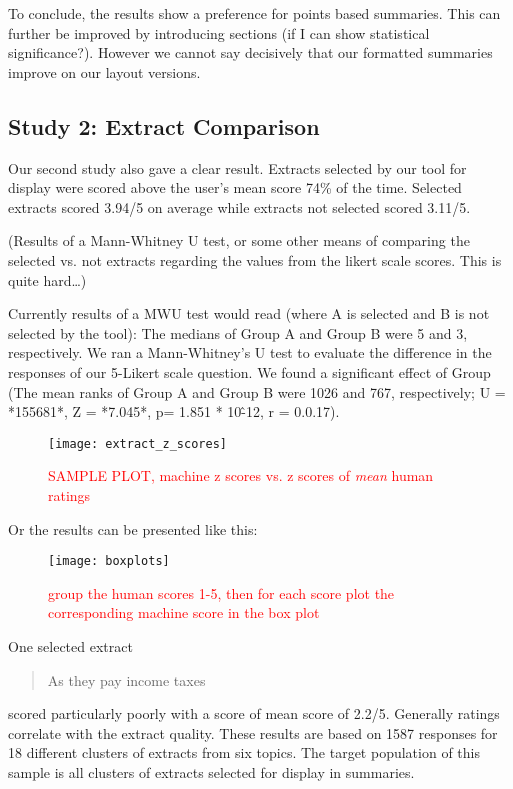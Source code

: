       To conclude, the results show a preference for points based summaries. This can further be improved by introducing sections (if I can show statistical significance?). However we cannot say decisively that our formatted summaries improve on our layout versions.

    \subsection{Study 2: Extract Comparison}
      Our second study also gave a clear result. Extracts selected by our tool for display were scored above the user's mean score 74\% of the time. Selected extracts scored 3.94/5 on average while extracts not selected scored 3.11/5.

      (Results of a Mann-Whitney U test, or some other means of comparing the selected vs. not extracts regarding the values from the likert scale scores. This is quite hard\dots)

      Currently results of a MWU test would read (where A is selected and B is not selected by the tool): The medians of Group A and Group B were 5 and 3, respectively. We ran a Mann-Whitney's U test to evaluate the difference in the responses of our 5-Likert scale question. We found a significant effect of Group (The mean ranks of Group A and Group B were 1026 and 767, respectively; U = *155681*, Z = *7.045*, p= 1.851 * 10\^-12, r = 0.0.17).

      \begin{figure}[h]
        \caption{\textcolor{red}{SAMPLE PLOT, machine z scores vs. z scores of \textit{mean} human ratings}}
        \centering
        \texttt{[image: extract\_z\_scores]}
      \end{figure}

      Or the results can be presented like this:
      \begin{figure}[h]
        \caption{\textcolor{red}{group the human scores 1-5, then for each score plot the corresponding machine score in the box plot}}
        \centering
        \texttt{[image: boxplots]}
      \end{figure}

      One selected extract \blockquote{As they pay income taxes} scored particularly poorly with a score of mean score of 2.2/5. Generally ratings correlate with the extract quality. These results are based on 1587 responses for 18 different clusters of extracts from six topics. The target population of this sample is all clusters of extracts selected for display in summaries.

